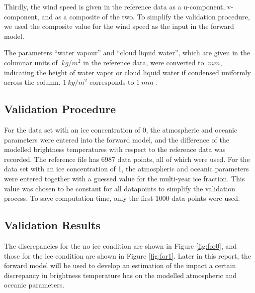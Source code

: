 \documentclass[11pt, a4paper]{article}
\begin{document}
Thirdly, the wind speed is given in the %
reference data as a u-component, v-component, and as a composite of the two. %
To simplify the validation procedure, we used the composite value for the wind speed as the input in the forward model. %
\newline

The parameters ``water vapour'' and ``cloud liquid water'', which are given in the columnar units of $\SI{}{kg/m^2}$ in the reference data, were converted to $\SI{}{mm}$, indicating the height of water vapor or cloud liquid water if condensed uniformly across the column. $\SI{1}{kg/m^2}$ corresponds to $\SI{1}{mm}$ \cite{remss}.


\subsection{Validation Procedure}

For the data set with an ice concentration of 0, the atmospheric and oceanic parameters were entered into the forward model, and the difference of the modelled brightness temperatures with respect to the reference data was recorded. The reference file has 6987 data points, all of which were used. For the data set with an ice concentration of 1, the atmospheric and oceanic parameters were entered together with a guessed value for the multi-year ice fraction. This value was chosen to be constant for all datapoints to simplify the validation process. To save computation time, only the first 1000 data points were used.


\subsection{Validation Results}

The discrepancies for the no ice condition are shown in Figure \ref{fig:for0}, and those for the ice condition are shown in Figure \ref{fig:for1}. Later in this report, the forward model will be used to develop an estimation of the impact a certain discrepancy in brightness temperature has on the modelled atmospheric and oceanic parameters.
\end{document}
